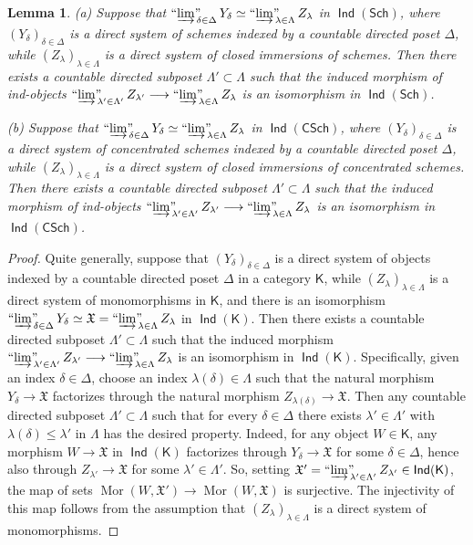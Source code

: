 \documentclass[12pt,a4paper]{amsart}
\newcommand{\+}{\protect\nobreakdash-}
\renewcommand{\:}{\colon}
\newcommand{\rarrow}{\longrightarrow}
\DeclareMathOperator{\Mor}{Mor}
\DeclareMathOperator{\Ind}{\mathsf{Ind}}
\newcommand{\Sch}{\mathsf{Sch}}
\newcommand{\CSch}{\mathsf{CSch}}
\newcommand{\ilim}
 {\mathop{\text{\normalfont``$\varinjlim$''\!\!}}\nolimits}
\newcommand{\sK}{\mathsf K}
\newcommand{\fX}{\mathfrak X}
\theoremstyle{plain}
\newtheorem{lem}[thm]{Lemma}
\theoremstyle{definition}
\begin{document}
\begin{lem} \label{strict-aleph0-ind-schemes-lemma}
\textup{(a)} Suppose that\/ $\ilim_{\delta\in\Delta}Y_\delta\simeq
\ilim_{\lambda\in\Lambda}Z_\lambda$ in\/ $\Ind(\Sch)$, where
$(Y_\delta)_{\delta\in\Delta}$ is a direct system of schemes indexed
by a countable directed poset\/ $\Delta$,  while
$(Z_\lambda)_{\lambda\in\Lambda}$ is a direct system
of closed immersions of schemes.
 Then there exists a countable directed subposet\/ $\Lambda'\subset
\Lambda$ such that the induced morphism of ind-objects\/
$\ilim_{\lambda'\in\Lambda'}Z_{\lambda'}\rarrow
\ilim_{\lambda\in\Lambda}Z_\lambda$ is an isomorphism
in\/ $\Ind(\Sch)$. \par
\textup{(b)} Suppose that\/ $\ilim_{\delta\in\Delta}Y_\delta\simeq
\ilim_{\lambda\in\Lambda}Z_\lambda$ in\/ $\Ind(\CSch)$, where
$(Y_\delta)_{\delta\in\Delta}$ is a direct system of concentrated
schemes indexed by a countable directed poset\/ $\Delta$, while
$(Z_\lambda)_{\lambda\in\Lambda}$ is a direct system
of closed immersions of concentrated schemes.
 Then there exists a countable directed subposet\/ $\Lambda'\subset
\Lambda$ such that the induced morphism of ind-objects\/
$\ilim_{\lambda'\in\Lambda'}Z_{\lambda'}\rarrow
\ilim_{\lambda\in\Lambda}Z_\lambda$ is an isomorphism
in\/ $\Ind(\CSch)$.
\end{lem}

\begin{proof}
 Quite generally, suppose that $(Y_\delta)_{\delta\in\Delta}$ is
a direct system of objects indexed by a countable directed poset
$\Delta$ in a category $\sK$, while $(Z_\lambda)_{\lambda\in\Lambda}$
is a direct system of monomorphisms in $\sK$, and there is
an isomorphism $\ilim_{\delta\in\Delta}Y_\delta\simeq\fX=
\ilim_{\lambda\in\Lambda}Z_\lambda$ in\/ $\Ind(\sK)$.
 Then there exists a countable directed subposet\/ $\Lambda'\subset
\Lambda$ such that the induced morphism
$\ilim_{\lambda'\in\Lambda'}Z_{\lambda'}\rarrow
\ilim_{\lambda\in\Lambda}Z_\lambda$ is an isomorphism
in $\Ind(\sK)$.
 Specifically, given an index $\delta\in\Delta$, choose an index
$\lambda(\delta)\in\Lambda$ such that the natural morphism
$Y_\delta\rarrow\fX$ factorizes through the natural morphism
$Z_{\lambda(\delta)}\rarrow\fX$.
 Then any countable directed subposet $\Lambda'\subset\Lambda$
such that for every $\delta\in\Delta$ there exists
$\lambda'\in\Lambda'$ with $\lambda(\delta)\le\lambda'$ in $\Lambda$
has the desired property.
 Indeed, for any object $W\in\sK$, any morphism $W\rarrow\fX$ in
$\Ind(\sK)$ factorizes through $Y_\delta\rarrow\fX$ for some
$\delta\in\Delta$, hence also through $Z_{\lambda'}\rarrow\fX$
for some $\lambda'\in\Lambda'$.
 So, setting $\fX'=\ilim_{\lambda'\in\Lambda'}Z_{\lambda'}
\in\Ind(\sK)$, the map of sets $\Mor(W,\fX')\rarrow\Mor(W,\fX)$
is surjective.
 The injectivity of this map follows from the assumption that
$(Z_\lambda)_{\lambda\in\Lambda}$ is a direct system of monomorphisms.
\end{proof}
\end{document}
